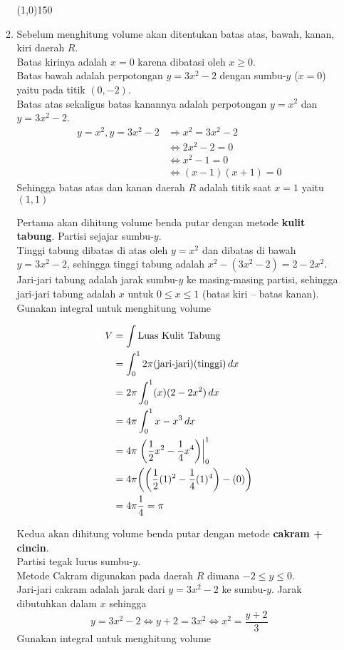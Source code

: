 \begin{enumerate}[leftmargin=*, label={\arabic*}.]
\begin{enumerate}[label={\alph*}.]
\begin{center}\line(1,0){150}\end{center}


    \item Sebelum menghitung volume akan ditentukan batas atas, bawah, kanan, kiri daerah $R$.\\
    Batas kirinya adalah $x=0$ karena dibatasi oleh $x\geq 0$.\\
    Batas bawah adalah perpotongan 
    $y=3x^{2}-2$ dengan sumbu-$y$ ($x=0$) yaitu pada titik $(0,-2)$.\\
    Batas atas sekaligus batas kanannya adalah perpotongan $y=x^{2}$ dan $y=3x^{2}-2$.
    \begin{align*}
        y=x^{2},y=3x^{2}-2 &\Longrightarrow x^{2}=3x^{2}-2\\
        &\iff 2x^{2}-2 = 0\\
        &\iff x^{2}-1=0\\
        &\iff (x-1)(x+1)=0
    \end{align*}
    Sehingga batas atas dan kanan daerah $R$ adalah titik saat $x=1$ yaitu $(1,1)$
    
    Pertama akan dihitung volume benda putar dengan metode \textbf{kulit tabung}. 
    Partisi sejajar sumbu-$y$.\\
    Tinggi tabung dibatas di atas oleh $y=x^{2}$ dan dibatas di bawah $y=3x^{2}-2$, 
    sehingga tinggi tabung adalah $x^{2}-(3x^{2}-2)=2-2x^{2}$.\\
    Jari-jari tabung adalah jarak sumbu-$y$ ke masing-masing partisi, sehingga 
    jari-jari tabung adalah $x$ untuk $0 \leq x \leq 1$ (batas kiri -- batas kanan).\\
    Gunakan integral untuk menghitung volume

    \begin{align*}
        V &= \int \text{Luas Kulit Tabung}\\
        &=\int_{0}^{1} 2\pi(\text{jari-jari})(\text{tinggi})\,dx\\
        &=2\pi\int_{0}^{1} (x)(2-2x^{2})\,dx\\
        &=4\pi\int_{0}^{1} x-x^{3}\,dx\\
        &=4\pi\eval{\frac{1}{2}x^{2}-\frac{1}{4}x^{4}}{0}{1}\\
        &=4\pi\brk*{\brk*{\frac{1}{2}(1)^{2}-\frac{1}{4}(1)^{4}}-(0)}\\
        &=4\pi\frac{1}{4} = \pi
    \end{align*}
    
    Kedua akan dihitung volume benda putar dengan metode \textbf{cakram + cincin}.\\ 
    Partisi tegak lurus sumbu-$y$.\\
    Metode Cakram digunakan pada daerah $R$ dimana $-2 \leq y \leq 0$.\\
    Jari-jari cakram adalah jarak dari $y=3x^{2}-2$ ke sumbu-$y$.
    Jarak dibutuhkan dalam $x$ sehingga
    \[
    y=3x^{2}-2 \iff y+2 = 3x^{2} \iff x^{2}=\frac{y+2}{3}
    \]
    Gunakan integral untuk menghitung volume


\end{enumerate}
\end{enumerate}
